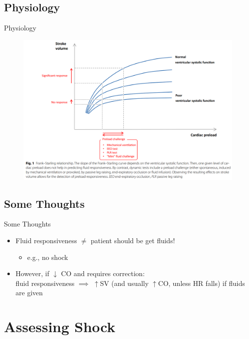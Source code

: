 \documentclass{beamer}
\begin{document}
	\subsection{Physiology}
	\begin{frame}{Physiology}
		\begin{figure}
			\centering
			\includegraphics[height=0.8\textheight]{figures/frankStarling}
			\label{fig:frankstarling}
		\end{figure}
	\end{frame}
	\subsection{Some Thoughts}
		\begin{frame}{Some Thoughts}
			\begin{itemize}
				\item Fluid responsiveness $\neq$ patient should be get fluids!
					\begin{itemize}
						\item e.g., no shock
					\end{itemize}
				\pause
				\item However, if $\downarrow$ CO and requires correction:\\
				fluid responsiveness $\implies$ $\uparrow$SV (and usually $\uparrow$CO, unless HR falls) if fluids are given
			\end{itemize}
		\end{frame}
	\section{Assessing Shock}
\end{document}
